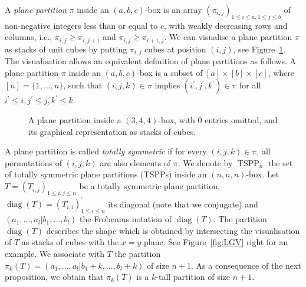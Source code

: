 \documentclass[11pt]{article}
\theoremstyle{definition}
\numberwithin{equation}{section}
\newcommand{\x}{\mathbf{x}}
\newcommand{\y}{\mathbf{y}}
\DeclareMathOperator{\TSPP}{TSPP}
\DeclareMathOperator{\diag}{diag}
\newcommand{\PlanePartition}[1]{\PlanePartitionColour{#1}{1}}
\newcounter{x}
\newcounter{y}
\newcounter{z}
\newcounter{help}
\newcommand{\PlanePartitionColour}[2]{
	\foreach \m [count=\y] in {#1}{	
		\foreach \z [count=\x] in \m{
			\setcounter{x}{\x}		
			\ifnum \z > 0		
				\TopBoundary{\x}{-\y}{\z}{#2}	
			\fi			
			\ifnum \x > 1				
				\ifnum \z < \thez				
					\setcounter{help}{\z}
					\addtocounter{help}{1}
					\foreach \zz in {\thehelp,...,\thez}{					
						\RightBoundary{(\x -1)}{(-\y)}{\zz}{#2}	
					}											
				\fi
			\fi
			\ifnum \y > 1		
				\foreach \mm [count=\yy] in {#1}{
				\ifnum \yy = \they		
				\foreach \zz [count=\xx] in \mm{	
				\ifnum \xx = \x	
				\ifnum \zz > \z	
					\setcounter{help}{\zz}
					\addtocounter{help}{-1}	
					\foreach \zzz in {\z,...,\thehelp}{
						\LeftBoundary{(\x -1)}{(1-\yy)}{\zzz}{#2}	
					}
				\fi
				\fi
				}
				\fi
				}
			\fi		
			\setcounter{z}{\z}
		}						
		\ifnum \thez >0	
			\foreach \z in {1,...,\thez}{
				\RightBoundary{\thex}{-\y}{\z}{#2}	
			}
		\fi
		\setcounter{y}{\y}
	}							
	\foreach \mm [count=\yy] in {#1}{	
	\ifnum \yy = \they
	\foreach \zz [count=\xx] in \mm{
	\ifnum \zz >0
		\foreach \zzz in {1,...,\zz}{
			\LeftBoundary{(\xx -1)}{(1-\yy)}{(\zzz-1)}{#2}
		}
	\fi
	}
	\fi
	}
	
}
\newcommand{\RightBoundaryColour}[4]{
\begin{scope}[xshift= 1cm*cos(30)*(#1+#2) , yshift=1cm*#3+1cm*sin(30)*(#2-#1)]
\draw [fill=#4] (0,0) -- ({1*cos(30)},{1*sin(30)}) -- ({1*cos(30)},{-1*sin(30)}) -- (0,-1) -- (0,0);
\end{scope}
}
\newcommand{\LeftBoundaryColour}[4]{
\begin{scope}[xshift= 1cm*cos(30)*(#1+#2) , yshift=1cm*#3+1cm*sin(30)*(#2-#1)]
\draw (0,0)[fill=#4] -- ({-1*cos(30)},{1*sin(30)}) -- ({-1*cos(30)},{-1*sin(30)}) -- (0,-1) -- (0,0);
\end{scope}
}
\newcommand{\TopBoundaryColour}[4]{
\begin{scope}[xshift= 1cm*cos(30)*(#1+#2) , yshift=1cm*#3+1cm*sin(30)*(#2-#1)]
\draw (0,0)[fill=#4] -- ({1*cos(30)},{1*sin(30)}) -- (0,1) -- ({-1*cos(30)},{1*sin(30)}) -- (0,0);
\end{scope}
}
\newcommand{\RightBoundary}[4]{
\ifnum #4 =1
	\RightBoundaryColour{#1}{#2}{#3}{green!80!black}
\else \ifnum #4=2
	\RightBoundaryColour{#1}{#2}{#3}{darkgray}
\else
	\RightBoundaryColour{#1}{#2}{#3}{white}
	\fi
\fi
}
\newcommand{\LeftBoundary}[4]{
\ifnum #4 =1
	\LeftBoundaryColour{#1}{#2}{#3}{blue}
\else \ifnum #4 = 2
	\LeftBoundaryColour{#1}{#2}{#3}{lightgray}
\else
	\LeftBoundaryColour{#1}{#2}{#3}{white}
	\fi
\fi
}
\newcommand{\TopBoundary}[4]{
\ifnum #4 =1
	\TopBoundaryColour{#1}{#2}{#3}{red}
\else \ifnum #4=2
	\TopBoundaryColour{#1}{#2}{#3}{white}
\else
	\TopBoundaryColour{#1}{#2}{#3}{white}
	\fi
\fi
}
\begin{document}
A \emph{plane partition} $\pi$ inside an $(a,b,c)$-box is an array $(\pi_{i,j})_{1 \leq i \leq a, 1 \leq j \leq b}$ of non-negative integers less than or equal to $c$, with weakly decreasing rows and columns, i.e., $\pi_{i,j} \geq \pi_{i,j+1}$ and  $\pi_{i,j} \geq \pi_{i+1,j}$. We can visualise a plane partition $\pi$ as stacks of unit cubes by putting $\pi_{i,j}$ cubes at position $(i,j)$, see Figure~\ref{fig: ex PP}. The visualisation allows an equivalent definition of plane partitions as follows. A plane partition $\pi$ inside an $(a,b,c)$-box is a subset of $[a]\times[b] \times[c]$, where $[n]=\{1,\ldots,n\}$, such that $(i,j,k) \in \pi$ implies $(i^\prime,j^\prime,k^\prime) \in \pi$ for all $i^\prime \leq i, j^\prime \leq j, k^\prime \leq k$.
\begin{figure}
\begin{center}
\caption{\label{fig: ex PP} A plane partition inside a $(3,4,4)$-box, with $0$ entries omitted, and its graphical representation as stacks of cubes.}
\end{center}
\end{figure}
A plane partition is called \emph{totally symmetric} if for every $(i,j,k) \in \pi$, all permutations of $(i,j,k)$ are also elements of $\pi$. We denote by $\TSPP_n$ the set of totally symmetric plane partitions (TSPPs) inside an $(n,n,n)$-box. Let $T=(T_{i,j})_{1\leq i,j \leq n}$ be a totally symmetric plane partition, $\diag(T)=(T_{i,i})_{1 \leq i \leq n}^\prime$ its diagonal (note that we conjugate) and $(a_1,\ldots,a_l|b_1,\ldots,b_l)$ the Frobenius notation of $\diag(T)$. The partition $\diag(T)$ describes the shape which is obtained by intersecting the visualisation of $T$ as stacks of cubes with the $x=y$ plane. See Figure~\ref{fig:LGV} right for an example. We associate with $T$ the partition $\pi_k(T)=(a_1,\ldots,a_l|b_1+k,\ldots,b_l+k)$ of size $n+1$. As a consequence of the next proposition, we obtain that $\pi_k(T)$ is a $k$-tall partition of size $n+1$.
\end{document}
